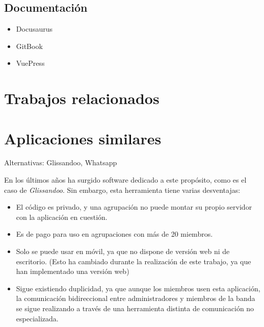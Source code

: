 \subsection{Documentación}
\begin{itemize}
    \item Docusaurus
    \item GitBook
    \item VuePress
\end{itemize}





\section{Trabajos relacionados}

\section{Aplicaciones similares}
Alternativas: Glissandoo, Whatsapp

En los últimos años ha surgido software dedicado a este propósito, como es el caso de \textit{Glissandoo}. Sin embargo, esta herramienta tiene varias desventajas:

\begin{itemize}
    \item El código es privado, y una agrupación no puede montar su propio servidor con la aplicación en cuestión.
    \item Es de pago para uso en agrupaciones con más de 20 miembros.
    \item Solo se puede usar en móvil, ya que no dispone de versión web ni de escritorio. (Esto ha cambiado durante la realización de este trabajo, ya que han implementado una versión web)
    \item Sigue existiendo duplicidad, ya que aunque los miembros usen esta aplicación, la comunicación bidireccional entre administradores y miembros de la banda se sigue realizando a través de una herramienta distinta de comunicación no especializada.
\end{itemize}

